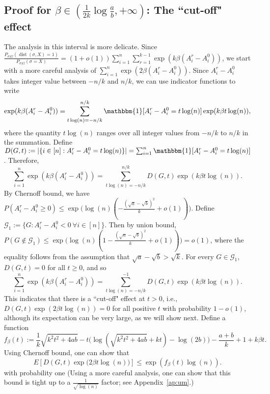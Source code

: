 \documentclass[conference]{IEEEtran}
\newcommand{\cG}{\mathcal{G}}
\DeclareMathOperator{\dist}{dist}
\begin{document}
\subsection{Proof for $\beta\in(\frac{1}{2k}\log\frac{a}{b},+\infty)$: The ``cut-off" effect}

The analysis in this interval is more delicate. Since $\frac{P_{\sigma|G} ( \dist(\sigma, X) = 1 )}{P_{\sigma|G}(\sigma= X)} 
= (1+o(1)) \sum_{i=1}^n \sum_{r=1}^{k-1}\exp (k\beta (A^r_i-A^0_i))$, we start with a more careful analysis of $\sum_{i=1}^n \exp (2 \beta (A^r_i-A^0_i))$.
Since $A^r_i-A^0_i$ takes integer value between $-n/k$ and $n/k$,
we can use indicator functions to write
\begin{align*}
 \exp (k \beta (A^r_i-A^0_i))
=  \sum_{t\log(n)=-n/k}^{n/k}
\mathbbm{1}[A^r_i-A^0_i=t \log(n)] \exp (k\beta t \log(n) ) ,
\end{align*}
where the quantity $t\log(n)$ ranges over all integer values from $-n/k$ to $n/k$ in the summation.
Define $D(G,t):=|\{i\in[n]:A^r_i-A^0_i= t\log(n)\}|=\sum_{i=1}^n \mathbbm{1}[A^r_i-A^0_i=t \log(n)]$.
Therefore,
\begin{equation}  \label{eq:gour}
 \sum_{i=1}^n \exp (k \beta (A^r_i-A^0_i))
=  \sum_{t\log(n)=-n/k}^{n/k}
D(G,t) \exp (k\beta t \log(n) ) .
\end{equation}
By Chernoff bound, we have $P(A^r_i-A^0_i\ge 0)\le \exp\big(\log(n)(-\frac{(\sqrt{a}-\sqrt{b})^2}{k} +o(1)) \big)$.
Define $\cG_1:=\{G:A^r_i-A^0_i< 0~\forall i\in[n]\}$. Then by union bound, $P(G\notin\cG_1)\le\exp\big(\log(n)(1-\frac{(\sqrt{a}-\sqrt{b})^2}{k} +o(1)) \big) = o(1)$, where the equality follows from the assumption that $\sqrt{a}-\sqrt{b}>\sqrt{k}$.
For every $G\in\cG_1$, $D(G,t)=0$ for all $t\ge 0$, and so
\begin{equation} \label{eq:duj}
 \sum_{i=1}^n \exp (k \beta (A^r_i-A^0_i))
=  \sum_{t\log(n)=-n/k}^{-1}
D(G,t) \exp (k\beta t \log(n) ) .
\end{equation}
This indicates that there is a ``cut-off" effect at $t>0$, i.e., $D(G,t) \exp (2\beta t \log(n) )=0$ for all positive $t$ with probability $1-o(1)$, although its expectation can be very large, as we will show next.
Define a function
$$
f_{\beta}(t):=\frac{1}{k}\sqrt{k^2t^2+4ab} -t\big(\log(\sqrt{k^2t^2+4ab}+kt)-\log(2b) \big) -\frac{a+b}{k} +1 +k\beta t.
$$
Using Chernoff bound, one can show that 
$$
E[D(G,t)
\exp\big(2\beta t \log(n) \big)]
\le \exp( f_{\beta}(t) \log(n) ) .
$$
with probability one (Using a more careful analysis, one can show that this bound is tight up to a $\frac{1}{\sqrt{\log(n)}}$ factor; see Appendix~\ref{ap:um}.)
\end{document}
